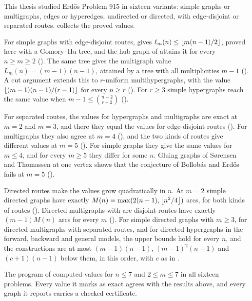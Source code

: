 This thesis studied Erd\H{o}s Problem 915 in sixteen variants: simple graphs or multigraphs, edges or hyperedges, undirected or directed, with edge-disjoint or separated routes.
 collects the proved values.

For simple graphs with edge-disjoint routes,  gives $\ell_m(n)\le\left\lfloor m(n-1)/2 \right\rfloor$, proved here with a Gomory--Hu tree, and the hub graph of  attains it for every $n\ge m\ge2$ ().
The same tree gives the multigraph value $L_m(n)=(m-1)(n-1)$, attained by a tree with all multiplicities $m-1$ ().
A cut argument extends this to $r$-uniform multihypergraphs, with the value $\left\lfloor (m-1)(n-1)/(r-1) \right\rfloor$ for every $n\ge r$ ().
For $r\ge3$ simple hypergraphs reach the same value when $m-1\le\binom{n-2}{r-2}$ ().

For separated routes, the values for hypergraphs and multigraphs are exact at $m=2$ and $m=3$, and there they equal the values for edge-disjoint routes ().
For multigraphs they also agree at $m=4$ (), and the two kinds of routes give different values at $m=5$ ().
For simple graphs they give the same values for $m\le4$, and for every $m\ge5$ they differ for some $n$. Gluing graphs of S{\o}rensen and Thomassen at one vertex shows that the conjecture of Bollob\'{a}s and Erd\H{o}s fails at $m=5$ ().

Directed routes make the values grow quadratically in $n$.
At $m=2$ simple directed graphs have exactly $M(n)=\max(2(n-1),\left\lfloor n^2/4 \right\rfloor)$ arcs, for both kinds of routes ().
Directed multigraphs with arc-disjoint routes have exactly $(m-1)M(n)$ arcs for every $m$ ().
For simple directed graphs with $m\ge3$, for directed multigraphs with separated routes, and for directed hypergraphs in the forward, backward and general models, the upper bounds hold for every $n$, and the constructions are at most $(m-1)(n-1)$, $(m-1)^2(n-1)$ and $(c+1)(n-1)$ below them, in this order, with $c$ as in .

The program of  computed values for $n\le7$ and $2\le m\le7$ in all sixteen problems.
Every value it marks as exact agrees with the results above, and every graph it reports carries a checked certificate.

